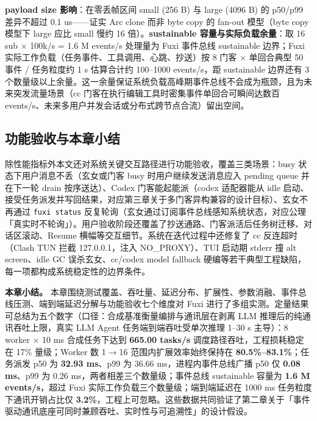 \textbf{payload size 影响}：在零丢帧区间 small (256 B) 与 large (4096 B) 的 p50/p99 差异不超过 0.1 us——证实 Arc clone 而非 byte copy 的 fan-out 模型（byte copy 模型下 large 应比 small 慢约 16 倍）。\textbf{sustainable 容量与实际负载余量}：取 16 sub × 100k/s = 1.6 M events/s 处理量为 Fuxi 事件总线 sustainable 边界；Fuxi 实际工作负载（任务事件、工具调用、心跳、抄送）按 8 门客 × 单回合典型 50 事件 / 任务粒度约 1 s 估算合计约 100--1000 events/s，距 sustainable 边界还有 3 个数量级以上余量。这一余量保证系统负载高峰期事件总线不会成为瓶颈，且为未来突发流量场景（cc 门客在执行编辑工具时密集事件单回合可瞬间达数百 events/s、未来多用户并发会话或分布式跨节点合流\cite{corbett2012spanner}）留出空间。

\subsection{功能验收与本章小结}

除性能指标外本文还对系统关键交互路径进行功能验收，覆盖三类场景：busy 状态下用户消息不丢（玄女或门客 busy 时用户继续发送消息应入 pending queue 并在下一轮 drain 按序送达）、Codex 门客能起能派（codex 适配器能从 idle 启动、接受任务派发并写回结果，对应第三章关于多门客异构兼容的设计目标）、玄女不再通过 \texttt{fuxi status} 反复轮询（玄女通过订阅事件总线感知系统状态，对应公理「真实时不轮询」）。用户验收阶段还覆盖了抄送通路、门客派活后任务树迁移、对话区滚动、Resume 横幅等交互细节。系统在迭代过程中还修复了 cc 反连超时（Clash TUN 拦截 127.0.0.1，注入 NO\_PROXY）、TUI 启动期 stderr 撞 alt screen、idle GC 误杀玄女、cc/codex model fallback 硬编等若干典型工程缺陷，每一项都构成系统稳定性的边界条件。

\textbf{本章小结。} 本章围绕测试覆盖、吞吐量、延迟分布、扩展性、参数消融、事件总线压测、端到端延迟分解与功能验收七个维度对 Fuxi 进行了多组实测。定量结果可总结为五个数字（口径：合成基准衡量编排与通讯层在剥离 LLM 推理后的纯通讯吞吐上限，真实 LLM Agent 任务端到端吞吐受单次推理 1--30 s 主导）：8 worker × 10 ms 合成任务下达到 \textbf{665.00 tasks/s} 调度路径吞吐，工程损耗稳定在 17\% 量级；Worker 数 1$\to$16 范围内扩展效率始终保持在 \textbf{80.5\%--83.1\%}；任务派发 p50 为 \textbf{32.93 ms}、p99 为 36.66 ms，进程内事件总线广播 p50 仅 \textbf{0.08 ms}、p99 为 0.26 ms，两者相差三个数量级；事件总线 sustainable 容量为 \textbf{1.6 M events/s}，超过 Fuxi 实际工作负载三个数量级；端到端延迟在 1000 ms 任务粒度下通讯开销占比仅 \textbf{3.2\%}，工程上可忽略。这些数据共同验证了第二章关于「事件驱动通讯底座可同时兼顾吞吐、实时性与可追溯性」的设计假设。
